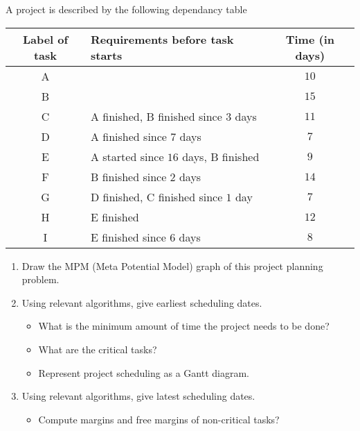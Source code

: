 \documentclass[12pt,a4paper]{article}
\begin{document}
\begin{question}
  A project is described by the following dependancy table
  \begin{center}
    \renewcommand{\arraystretch}{1.5}
    \begin{tabularx}{.825\textwidth}{|c|p{6.75cm}|c|}
      \hline
      Label of task & Requirements before task starts & Time (in days)  \\
      \hline
      A  & & $10$  \\
      \hline
      B  &  & $15$  \\
      \hline
      C  & A finished, B finished since $3$ days & $11$  \\
      \hline
      D  & A finished since $7$ days & $7$  \\
      \hline
      E  & A started since $16$ days, B finished & $9$ \\
      \hline
      F  & B finished since $2$ days & $14$  \\
      \hline
      G  & D finished, C finished since $1$ day & $7$ \\
      \hline
      H  & E finished & $12$ \\
      \hline
      I  & E finished since $6$ days & $8$  \\
      \hline
    \end{tabularx}
  \end{center}
  \vspace{\baselineskip}
  \begin{enumerate}
  \item Draw the MPM (Meta Potential Model) graph of this project
    planning problem.
  \item Using relevant algorithms, give earliest scheduling dates.
    \begin{itemize}
    \item What is the minimum amount of time the project needs to be done?
    \item What are the critical tasks?
    \item Represent project scheduling as a Gantt diagram.
    \end{itemize}
  \item Using relevant algorithms, give latest scheduling dates.
    \begin{itemize}
    \item Compute margins and free margins of non-critical tasks?
    \end{itemize}
  \end{enumerate}
\end{question}
\end{document}
